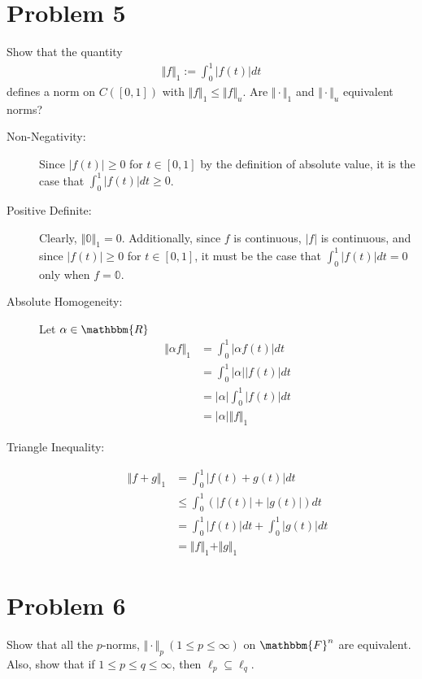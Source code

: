 \documentclass[10pt]{extarticle}
\newcommand{\R}{\mathbbm{R}}
\begin{document}
  \section{Problem 5}%
  Show that the quantity
  \begin{align*}
    \Vert f \Vert_1 := \int_{0}^{1}|f(t)| dt
  \end{align*}
  defines a norm on $C([0,1])$ with $\Vert f\Vert_1 \leq \Vert f \Vert_u$. Are $\Vert \cdot \Vert_1$ and $\Vert \cdot \Vert_u$ equivalent norms?
  \begin{description}
    \item[Non-Negativity:] Since $|f(t)| \geq 0$ for $t\in [0,1]$ by the definition of absolute value, it is the case that $\int_{0}^{1}|f(t)|dt\geq 0$.
    \item[Positive Definite:] Clearly, $\Vert \mathbb{0}\Vert_1 = 0$. Additionally, since $f$ is continuous, $|f|$ is continuous, and since $|f(t)| \geq 0$ for $t\in [0,1]$, it must be the case that $\int_{0}^{1}|f(t)|dt = 0$ only when $f = \mathbb{0}$.
    \item[Absolute Homogeneity:] Let $\alpha\in\R$
      \begin{align*}
        \Vert \alpha f \Vert_1 &= \int_{0}^{1}|\alpha f(t)|dt\\
                               &= \int_{0}^{1}|\alpha||f(t)|dt\\
                               &= |\alpha|\int_{0}^{1}|f(t)|dt\\
                               &= |\alpha|\Vert f\Vert_1
      \end{align*}
    \item[Triangle Inequality:]
      \begin{align*}
        \Vert f + g \Vert_1 &= \int_{0}^{1}|f(t) + g(t)|dt\\
                            &\leq \int_{0}^{1}\left(|f(t)| + |g(t)|\right)dt\\
                            &= \int_{0}^{1}|f(t)|dt + \int_{0}^{1}|g(t)|dt\\
                            &= \Vert f \Vert_1 + \Vert g \Vert_1
      \end{align*}
  \end{description}
  \section{Problem 6}%
  Show that all the $p$-norms, $\Vert \cdot \Vert_p~(1\leq p \leq \infty)$ on $\mathbbm{F}^n$ are equivalent. Also, show that if $1\leq p \leq q \leq \infty$, then $\ell_p \subseteq \ell_q$.
\end{document}
